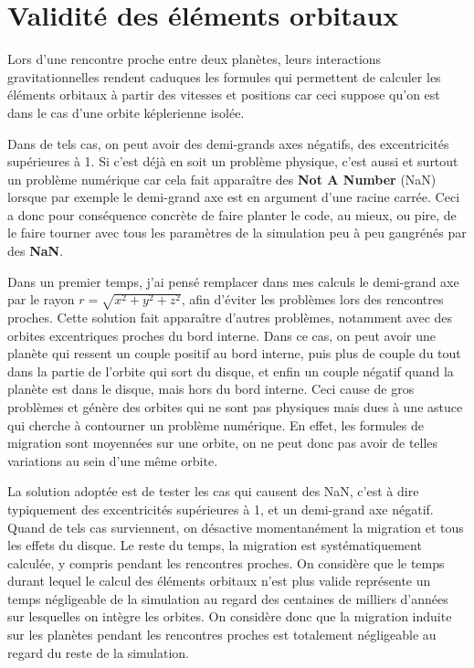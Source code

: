 \section{Validité des éléments orbitaux}
Lors d'une rencontre proche entre deux planètes, leurs interactions gravitationnelles rendent caduques les formules qui permettent de calculer les éléments orbitaux à partir des vitesses et positions car ceci suppose qu'on est dans le cas d'une orbite képlerienne isolée. 

Dans de tels cas, on peut avoir des demi-grands axes négatifs, des excentricités supérieures à 1. Si c'est déjà en soit un 
problème physique, c'est aussi et surtout un problème numérique car cela fait apparaître des \textbf{Not A Number} (NaN) lorsque 
par exemple le demi-grand axe est en argument d'une racine carrée. Ceci a donc pour conséquence concrète de faire planter le 
code, au mieux, ou pire, de le faire tourner avec tous les paramètres de la simulation peu à peu gangrénés par des 
\textbf{NaN}. 

Dans un premier temps, j'ai pensé remplacer dans mes calculs le demi-grand axe par le rayon $r=\sqrt{x^2+y^2+z^2}$, afin 
d'éviter les problèmes lors des rencontres proches. Cette solution fait apparaître d'autres problèmes, notamment avec des 
orbites excentriques proches du bord interne. Dans ce cas, on peut avoir une planète qui ressent un couple positif au bord 
interne, puis plus de couple du tout dans la partie de l'orbite qui sort du disque, et enfin un couple négatif quand la planète 
est dans le disque, mais hors du bord interne. Ceci cause de gros problèmes et génère des orbites qui ne sont pas physiques 
mais dues à une astuce qui cherche à contourner un problème numérique. En effet, les formules de migration sont moyennées sur 
une orbite, on ne peut donc pas avoir de telles variations au sein d'une même orbite.

La solution adoptée est de tester les cas qui causent des NaN, c'est à dire typiquement des excentricités supérieures à 1, et 
un demi-grand axe négatif. Quand de tels cas surviennent, on désactive momentanément la migration et tous les effets du 
disque. Le reste du temps, la migration est systématiquement calculée, y compris pendant les rencontres proches. On considère 
que le temps durant lequel le calcul des éléments orbitaux n'est plus valide représente un temps négligeable de la 
simulation au regard des centaines de milliers d'années sur lesquelles on intègre les orbites. On considère donc que la 
migration induite sur les planètes pendant les rencontres proches est totalement négligeable au regard du reste de la 
simulation.
